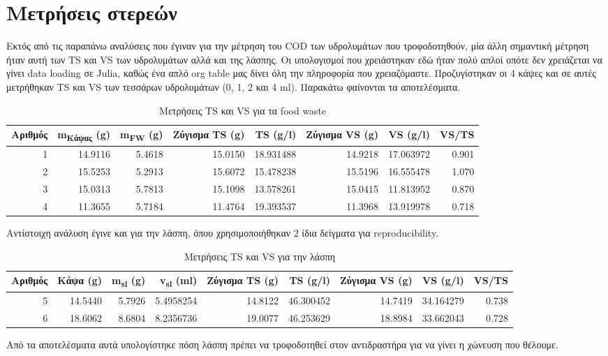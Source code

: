 \documentclass[11pt]{article}
\begin{document}
\section{Μετρήσεις στερεών}
\label{sec:orgb7c9edc}
Εκτός από τις παραπάνω αναλύσεις που έγιναν για την μέτρηση του COD των υδρολυμάτων που τροφοδοτηθούν, μία άλλη σημαντική μέτρηση ήταν αυτή των TS και VS των υδρολυμάτων αλλά και της λάσπης. Οι υπολογισμοί που χρειάστηκαν εδώ ήταν πολύ απλοί οπότε δεν χρειάζεται να γίνει data loading σε Julia, καθώς ένα απλό org table μας δίνει όλη την πληροφορία που χρειαζόμαστε. Προζυγίστηκαν οι 4 κάψες και σε αυτές μετρήθηκαν TS και VS των τεσσάρων υδρολυμάτων (0, 1, 2 και 4 ml). Παρακάτω φαίνονται τα αποτελέσματα.

\begin{table}[htbp]
\caption{Μετρήσεις TS και VS για τα food waste}
\centering
\begin{tabular}{rrrrrrrr}
Αριθμός & m\textsubscript{Κάψας} (g) & m\textsubscript{FW} (g) & Ζύγισμα TS (g) & TS (g/l) & Ζύγισμα VS (g) & VS (g/l) & VS/TS\\[0pt]
\hline
1 & 14.9116 & 5.4618 & 15.0150 & 18.931488 & 14.9218 & 17.063972 & 0.901\\[0pt]
2 & 15.5253 & 5.2913 & 15.6072 & 15.478238 & 15.5196 & 16.555478 & 1.070\\[0pt]
3 & 15.0313 & 5.7813 & 15.1098 & 13.578261 & 15.0415 & 11.813952 & 0.870\\[0pt]
4 & 11.3655 & 5.7184 & 11.4764 & 19.393537 & 11.3968 & 13.919978 & 0.718\\[0pt]
\end{tabular}
\end{table}

Αντίστοιχη ανάλυση έγινε και για την λάσπη, όπου χρησιμοποιήθηκαν 2 ίδια δείγματα για reproducibility.

\begin{table}[htbp]
\caption{Μετρήσεις TS και VS για την λάσπη}
\centering
\begin{tabular}{rrrrrrrrr}
Αριθμός & Κάψα (g) & m\textsubscript{sl} (g) & v\textsubscript{sl} (ml) & Ζύγισμα TS (g) & TS (g/l) & Ζύγισμα VS (g) & VS (g/l) & VS/TS\\[0pt]
\hline
5 & 14.5440 & 5.7926 & 5.4958254 & 14.8122 & 46.300452 & 14.7419 & 34.164279 & 0.738\\[0pt]
6 & 18.6062 & 8.6804 & 8.2356736 & 19.0077 & 46.253629 & 18.8984 & 33.662043 & 0.728\\[0pt]
\end{tabular}
\end{table}

Από τα αποτελέσματα αυτά υπολογίστηκε πόση λάσπη πρέπει να τροφοδοτηθεί στον αντιδραστήρα για να γίνει η χώνευση που θέλουμε.
\end{document}
